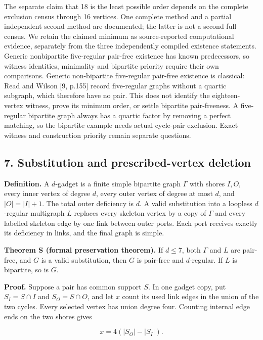 \documentclass[
  11pt,
]{article}
\begin{document}
The separate claim that 18 is the least possible order depends on the
complete exclusion census through 16 vertices. One complete method and a
partial independent second method are documented; the latter is not a
second full census. We retain the claimed minimum as source-reported
computational evidence, separately from the three independently compiled
existence statements. Generic nonbipartite five-regular pair-free
existence has known predecessors, so witness identities, minimality and
bipartite priority require their own comparisons. Generic non-bipartite
five-regular pair-free existence is classical: Read and Wilson {[}9,
p.155{]} record five-regular graphs without a quartic subgraph, which
therefore have no pair. This does not identify the eighteen-vertex
witness, prove its minimum order, or settle bipartite pair-freeness. A
five-regular bipartite graph always has a quartic factor by removing a
perfect matching, so the bipartite example needs actual cycle-pair
exclusion. Exact witness and construction priority remain separate
questions.

\subsection{7. Substitution and prescribed-vertex
deletion}\label{substitution-and-prescribed-vertex-deletion}

\textbf{Definition.} A \(d\)-gadget is a finite simple bipartite graph
\(\Gamma\) with shores \(I,O\), every inner vertex of degree \(d\),
every outer vertex of degree at most \(d\), and \(|O|=|I|+1\). The total
outer deficiency is \(d\). A valid substitution into a loopless
\(d\)-regular multigraph \(L\) replaces every skeleton vertex by a copy
of \(\Gamma\) and every labelled skeleton edge by one link between outer
ports. Each port receives exactly its deficiency in links, and the final
graph is simple.

\textbf{Theorem S (formal preservation theorem).} If \(d\leq7\), both
\(\Gamma\) and \(L\) are pair-free, and \(G\) is a valid substitution,
then \(G\) is pair-free and \(d\)-regular. If \(L\) is bipartite, so is
\(G\).

\textbf{Proof.} Suppose a pair has common support \(S\). In one gadget
copy, put \(S_I=S\cap I\) and \(S_O=S\cap O\), and let \(x\) count its
used link edges in the union of the two cycles. Every selected vertex
has union degree four. Counting internal edge ends on the two shores
gives

\[
x=4(|S_O|-|S_I|).
\]
\end{document}
